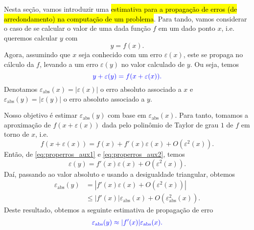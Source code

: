 Nesta seção, vamos introduzir uma \hl{estimativa para a propagação de erros (de arredondamento) na computação de um problema}. Para tando, vamos considerar o caso de se calcular o valor de uma dada função $f$ em um dado ponto $x$, i.e. queremos calcular $y$ com
\begin{equation}\label{eq:properros_aux1}
  y = f(x).
\end{equation}
Agora, assumindo que $x$ seja conhecido com um erro $\varepsilon(x)$, este se propaga no cálculo da $f$, levando a um erro $\varepsilon(y)$ no valor calculado de $y$. Ou seja, temos
\begin{equation}\label{eq:properros_aux2}
  \color{blue}y + \varepsilon(y) = f(x+\varepsilon(x)).
\end{equation}
Denotamos $\varepsilon_{\text{abs}}(x) = |\varepsilon(x)|$ o erro absoluto associado a $x$ e $\varepsilon_{\text{abs}}(y) = |\varepsilon(y)|$ o erro absoluto associado a $y$.

Nosso objetivo é estimar $\varepsilon_{\text{abs}}(y)$ com base em $\varepsilon_{\text{abs}}(x)$. Para tanto, tomamos a aproximação de $f(x+\varepsilon(x))$ dada pelo polinômio de Taylor de grau $1$ de $f$ em torno de $x$, i.e.
\begin{equation}
  f(x+\varepsilon(x)) = f(x) + f'(x)\varepsilon(x) + O\left(\varepsilon^2(x)\right).
\end{equation}
Então, de \eqref{eq:properros_aux1} e \eqref{eq:properros_aux2}, temos
\begin{equation}
  \varepsilon(y) = f'(x)\varepsilon(x) + O(\varepsilon^2(x)).
\end{equation}
Daí, passando ao valor absoluto e usando a desigualdade triangular, obtemos
\begin{align}
  \varepsilon_{\text{abs}}(y) &= \left|f'(x)\varepsilon(x) + O(\varepsilon^2(x))\right|\\
                              &\leq |f'(x)|\varepsilon_{\text{abs}}(x) + O\left(\varepsilon_{\text{abs}}^2(x)\right).
\end{align}
Deste resultado, obtemos a seguinte estimativa de propagação de erro
\begin{equation}\label{eq:estproperro_1}
  \color{blue}\varepsilon_{\text{abs}}(y) \approx |f'(x)|\varepsilon_{\text{abs}}(x).
\end{equation}

